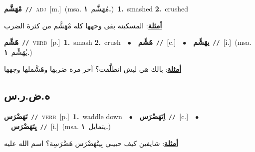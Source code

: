 \documentclass[10pt,a4paper,twoside]{article} %
\begin{document}
\begin{multicols}{2}
{\setlength\topsep{0pt}\textbf{\foreignlanguage{arabic}{مْهَشَّم}}\ {\color{gray}\texttt{//}\color{black}}\ \textsc{adj}\ [m.]\ \color{gray}(msa. \foreignlanguage{arabic}{مُهَشَّم}~\foreignlanguage{arabic}{\textbf{١.}})\color{black}\ \textbf{1.}~smashed  \textbf{2.}~crushed\  \begin{flushright}\color{gray}\foreignlanguage{arabic}{\textbf{\underline{\foreignlanguage{arabic}{أمثلة}}}: المسكينة بقى وجهها كله مْهَشَّم من كثرة الضرب}\end{flushright}\color{black}} \vspace{2mm}

{\setlength\topsep{0pt}\textbf{\foreignlanguage{arabic}{هَشَّم}}\ {\color{gray}\texttt{//}\color{black}}\ \textsc{verb}\ [p.]\ \textbf{1.}~smash  \textbf{2.}~crush\ \ $\bullet$\ \ \setlength\topsep{0pt}\textbf{\foreignlanguage{arabic}{هَشِّم}}\ {\color{gray}\texttt{//}\color{black}}\ [c.]\ \ $\bullet$\ \ \setlength\topsep{0pt}\textbf{\foreignlanguage{arabic}{يهَشِّم}}\ {\color{gray}\texttt{//}\color{black}}\ [i.]\ \color{gray}(msa. \foreignlanguage{arabic}{يُهَشِّم}~\foreignlanguage{arabic}{\textbf{١.}})\color{black}\  \begin{flushright}\color{gray}\foreignlanguage{arabic}{\textbf{\underline{\foreignlanguage{arabic}{أمثلة}}}: بالك هي ليش اتطلَّقت؟ آخر مرة ضربها وهَشَّملها وجهها}\end{flushright}\color{black}} \vspace{2mm}

\vspace{-3mm}
\subsection*{\color{blue}\foreignlanguage{arabic}{ه.ض.ر.س}\color{blue}{}} 

{\setlength\topsep{0pt}\textbf{\foreignlanguage{arabic}{تَهَضْرَس}}\ {\color{gray}\texttt{//}\color{black}}\ \textsc{verb}\ [p.]\ \textbf{1.}~waddle down\ \ $\bullet$\ \ \setlength\topsep{0pt}\textbf{\foreignlanguage{arabic}{اِتَهَضْرَس}}\ {\color{gray}\texttt{//}\color{black}}\ [c.]\ \ $\bullet$\ \ \setlength\topsep{0pt}\textbf{\foreignlanguage{arabic}{يِتَهَضْرَس}}\ {\color{gray}\texttt{//}\color{black}}\ [i.]\ \color{gray}(msa. \foreignlanguage{arabic}{يتمايل}~\foreignlanguage{arabic}{\textbf{١.}})\color{black}\  \begin{flushright}\color{gray}\foreignlanguage{arabic}{\textbf{\underline{\foreignlanguage{arabic}{أمثلة}}}: شايفين كيف حبيبي بِيتْهَضْرَس هَضْرَسِة؟ اسم الله عليه}\end{flushright}\color{black}} \vspace{2mm}


\end{multicols}
\end{document}
